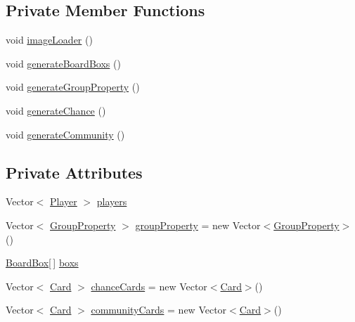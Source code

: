 \subsection*{Private Member Functions}
\begin{DoxyCompactItemize}
\item 
void \hyperlink{class_monopoly_1_1_logic_1_1_board_a41b55ad25adfcb623babe8617cef8d85}{image\+Loader} ()
\item 
void \hyperlink{class_monopoly_1_1_logic_1_1_board_a5a87f17bb63a04330d75c0044cdd16cf}{generate\+Board\+Boxs} ()
\item 
void \hyperlink{class_monopoly_1_1_logic_1_1_board_a3b3b8740be9137223c6f802daa753d9d}{generate\+Group\+Property} ()
\item 
void \hyperlink{class_monopoly_1_1_logic_1_1_board_ac4b80ff5f150d6119dba1a201e2c49ea}{generate\+Chance} ()
\item 
void \hyperlink{class_monopoly_1_1_logic_1_1_board_acfeda00714d80e32b9163a1493fa0e8d}{generate\+Community} ()
\end{DoxyCompactItemize}
\subsection*{Private Attributes}
\begin{DoxyCompactItemize}
\item 
Vector$<$ \hyperlink{class_monopoly_1_1_logic_1_1_player}{Player} $>$ \hyperlink{class_monopoly_1_1_logic_1_1_board_ae0af8df9bdefdb9dad582cab0abd1abe}{players}
\item 
Vector$<$ \hyperlink{class_monopoly_1_1_logic_1_1_group_property}{Group\+Property} $>$ \hyperlink{class_monopoly_1_1_logic_1_1_board_a6861185113e9efbff62d0c02ad1aafad}{group\+Property} = new Vector$<$\hyperlink{class_monopoly_1_1_logic_1_1_group_property}{Group\+Property}$>$()
\item 
\hyperlink{class_monopoly_1_1_logic_1_1_board_box}{Board\+Box}\mbox{[}$\,$\mbox{]} \hyperlink{class_monopoly_1_1_logic_1_1_board_a3ef95f74f882c732d9747a957341aad1}{boxs}
\item 
Vector$<$ \hyperlink{class_monopoly_1_1_logic_1_1_card}{Card} $>$ \hyperlink{class_monopoly_1_1_logic_1_1_board_aaebf7a0020990db049c286e5778b0809}{chance\+Cards} = new Vector$<$\hyperlink{class_monopoly_1_1_logic_1_1_card}{Card}$>$()
\item 
Vector$<$ \hyperlink{class_monopoly_1_1_logic_1_1_card}{Card} $>$ \hyperlink{class_monopoly_1_1_logic_1_1_board_a48b98e8f6f9319826d2faf5ff88172a2}{community\+Cards} = new Vector$<$\hyperlink{class_monopoly_1_1_logic_1_1_card}{Card}$>$()
\end{DoxyCompactItemize}


